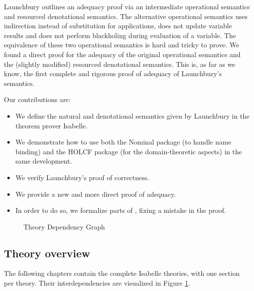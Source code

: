 \documentclass[11pt,a4paper,parskip=half]{scrartcl}
\begin{document}
Launchbury outlines an adequacy proof via an intermediate operational semantics and resourced denotational semantics. The alternative operational semantics  uses indirection instead of substitution for applications, does not update variable results and does not perform blackholing during evaluation of a variable. The equivalence of these two operational semantics is hard and tricky to prove. We found a direct proof for the adequacy of the original operational semantics and the (slightly modified) resourced denotational semantics. This is, as far as we know, the first complete and rigorous proof of adequacy of Launchbury's semantics.

Our contributions are:
\begin{itemize}
\item We define the natural and denotational semantics given by Launchbury in the theorem prover Isabelle.
\item We demonstrate how to use both the Nominal package (to handle name binding) \cite{nominal} and the HOLCF \cite{holcf} package (for the domain-theoretic aspects) in the same development.
\item We verify Launchbury's proof of correctness.
\item We provide a new and more direct proof of adequacy.
\item In order to do so, we formalize parts of \cite{functionspaces}, fixing a mistake in the proof.
\end{itemize}

%




\begin{figure}
\begin{center}
\end{center}
\caption{Theory Dependency Graph\label{theory-deps}}
\end{figure}

\subsection{Theory overview}

The following chapters contain the complete Isabelle theories, with one section per theory. Their interdependencies are visualized in Figure \ref{theory-deps}.
\end{document}

